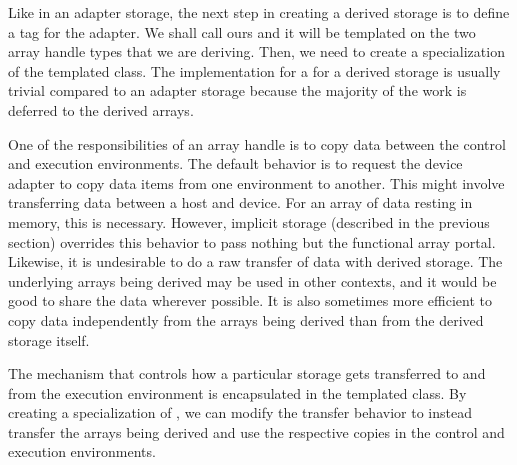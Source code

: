 

Like in an adapter storage, the next step in creating a derived storage
is to define a tag for the adapter. We shall call ours
 and it will be templated on
the two array handle types that we are deriving. Then, we need to create a
specialization of the templated 
class. The implementation for a  for
a derived storage is usually trivial compared to an adapter storage
because the majority of the work is deferred to the derived arrays.


One of the responsibilities of an array handle is to copy data between the
control and execution environments. The default behavior is to request the
device adapter to copy data items from one environment to another. This
might involve transferring data between a host and device. For an array of
data resting in memory, this is necessary. However, implicit storage
(described in the previous section) overrides this behavior to pass nothing
but the functional array portal. Likewise, it is undesirable to do a raw
transfer of data with derived storage. The underlying arrays being
derived may be used in other contexts, and it would be good to share the
data wherever possible. It is also sometimes more efficient to copy data
independently from the arrays being derived than from the derived storage
itself.


The mechanism that controls how a particular storage gets
transferred to and from the execution environment is encapsulated in the
templated  class. By creating a
specialization of , we can modify the
transfer behavior to instead transfer the arrays being derived and use the
respective copies in the control and execution environments.

